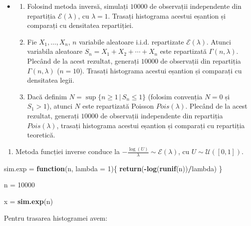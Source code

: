 \documentclass[]{article}
\newenvironment{Shaded}{\begin{snugshade}}{\end{snugshade}}
\newcommand{\KeywordTok}[1]{\textcolor[rgb]{0.13,0.29,0.53}{\textbf{#1}}}
\newcommand{\DataTypeTok}[1]{\textcolor[rgb]{0.13,0.29,0.53}{#1}}
\newcommand{\DecValTok}[1]{\textcolor[rgb]{0.00,0.00,0.81}{#1}}
\newcommand{\StringTok}[1]{\textcolor[rgb]{0.31,0.60,0.02}{#1}}
\newcommand{\ControlFlowTok}[1]{\textcolor[rgb]{0.13,0.29,0.53}{\textbf{#1}}}
\newcommand{\OperatorTok}[1]{\textcolor[rgb]{0.81,0.36,0.00}{\textbf{#1}}}
\newcommand{\NormalTok}[1]{#1}
\providecommand{\tightlist}{%
  \setlength{\itemsep}{0pt}\setlength{\parskip}{0pt}}
\newenvironment{frshaded*}{%
  \def\FrameCommand{\fboxrule=\FrameRule\fboxsep=\FrameSep \fcolorbox{framecolor}{shadecolor1}}%
  \MakeFramed {\advance\hsize-\width \FrameRestore}}%
{\endMakeFramed}
\newenvironment{rmdblock}[1]
  {\begin{frshaded*}
  \begin{itemize}
  \renewcommand{\labelitemi}{
    \raisebox{-.7\height}[0pt][0pt]{
      {\setkeys{Gin}{width=2em,keepaspectratio}\texttt{[image: images/icons/\#1]}}
    }
  }
  \item
  }
  {
  \end{itemize}
  \end{frshaded*}
  }
\newenvironment{rmdexercise}
  {\begin{rmdblock}{exercise}}
  {\end{rmdblock}}
\begin{document}
\begin{rmdexercise}
\begin{enumerate}
\def\labelenumi{\arabic{enumi}.}
\item
  Folosind metoda inversă, simulați \(10000\) de observații independente
  din repartiția \(\mathcal{E}(\lambda)\), cu \(\lambda = 1\). Trasați
  histograma acestui eșantion și comparați cu densitatea repartiției.
\item
  Fie \(X_1, \ldots, X_n\), \(n\) variabile aleatoare i.i.d. repartizate
  \(\mathcal{E}(\lambda)\). Atunci variabila aleatoare
  \(S_n = X_1 + X_2 +\cdots+ X_n\) este repartizată
  \(\Gamma(n, \lambda)\). Plecând de la acest rezultat, generați
  \(10000\) de observații din repartiția \(\Gamma(n, \lambda)\)
  (\(n = 10\)). Trasați histograma acestui eșantion și comparați cu
  densitatea legii.
\item
  Dacă definim \(N = \sup\{n\geq 1\,|\, S_n\leq 1\}\) (folosim convenția
  \(N = 0\) și \(S_1>1\)), atunci \(N\) este repartizată Poisson
  \(Pois(\lambda)\). Plecând de la acest rezultat, generați \(10000\) de
  observații independente din repartiția \(Pois(\lambda)\), trasați
  histograma acestui eșantion și comparați cu repartiția teoretică.
\end{enumerate}
\end{rmdexercise}

\begin{enumerate}
\def\labelenumi{\arabic{enumi}.}
\tightlist
\item
  Metoda funcției inverse conduce la
  \(-\frac{\log(U)}{\lambda}\sim\mathcal{E}(\lambda)\), cu
  \(U\sim\mathcal{U}([0,1])\).
\end{enumerate}

\begin{Shaded}
\begin{Highlighting}[]
\NormalTok{sim.exp =}\StringTok{ }\ControlFlowTok{function}\NormalTok{(n, }\DataTypeTok{lambda =} \DecValTok{1}\NormalTok{)\{}
  \KeywordTok{return}\NormalTok{(}\OperatorTok{-}\KeywordTok{log}\NormalTok{(}\KeywordTok{runif}\NormalTok{(n))}\OperatorTok{/}\NormalTok{lambda)}
\NormalTok{\}}

\NormalTok{n =}\StringTok{ }\DecValTok{10000}

\NormalTok{x =}\StringTok{ }\KeywordTok{sim.exp}\NormalTok{(n)}
\end{Highlighting}
\end{Shaded}

Pentru trasarea histogramei avem:
\end{document}
